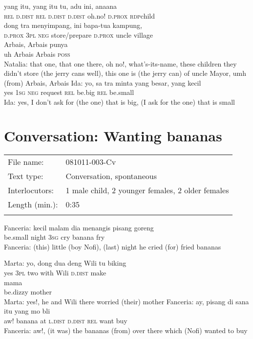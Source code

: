 \ea
{}    {yang}    {itu,}   yang   itu   tu,    {adu}    {ini,}   ana{\Tilde}ana\\
   {}    {\textsc{rel}}    {\textsc{d.dist}}   \textsc{rel}   \textsc{d.dist}   \textsc{d.dist}    {oh.no!}    {\textsc{d.prox}}   \textsc{rdp}{\Tilde}child\\
    {dong}    {tra}    {menyimpang,}    {ini}    {bapa-tua}    {kampung,}\\
   {\textsc{d.prox}}    {\textsc{3pl}}    {\textsc{neg}}    {store/prepare}    {\textsc{d.prox}}    {uncle}    {village}\\
   {Arbais,}    {Arbais}    {punya}\\
  uh    {Arbais}    {Arbais}    {\textsc{poss}}\\
\glt
Natalia: that one, that one there, oh no!, what’s-its-name, these children they didn’t store (the jerry cans well), this one is (the jerry can) of uncle Mayor, umh (from) Arbais, Arbais
\z
\ea
\gll   Ida:   yo,   sa   tra   minta   yang   besar,   yang   kecil\\
{}   yes   \textsc{1sg}   \textsc{neg}   request   \textsc{rel}   be.big   \textsc{rel}   be.small\\
\glt
Ida: yes, I don’t ask for (the one) that is big, (I ask for the one) that is small
\z

\section{Conversation: Wanting bananas}
\label{Para_B.3}
\begin{tabular}{ll}
\lsptoprule
File name: &  081011-003-Cv\\
Text type: &  Conversation, spontaneous\\
Interlocutors: &  1 male child, 2 younger females, 2 older females\\
Length (min.): &  0:35\\
\lspbottomrule
\end{tabular}
\setcounter{equation}{0}
\ea
\gll   Fanceria:   kecil   malam   dia   menangis   pisang   goreng\\
{}  be.small   night   \textsc{3sg}   cry   banana   fry\\
\glt
Fanceria: (this) little (boy Nofi), (last) night he cried (for) fried bananas
\z

\ea
\gll   Marta:    {yo,}   dong   dua   deng   Wili   tu   biking\\
{}   {yes}   \textsc{3pl}   two   with   Wili   \textsc{d.dist}   make\\
    {mama}\\
   {be.dizzy}    {mother}\\
\glt
Marta: yes!, he and Wili there worried (their) mother
\z
\ea
\gll   Fanceria:   ay,   pisang   di   sana   itu   yang   mo   bli\\
{}  aw!   banana   at   \textsc{l.dist}   \textsc{d.dist}   \textsc{rel}   want   buy\\
\glt
Fanceria: aw!, (it was) the bananas (from) over there which (Nofi) wanted to buy
\z

